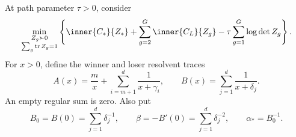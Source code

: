 At path parameter $\tau>0$, consider
\begin{equation}
 \min_{\substack{Z_g\succ0\\ \sum_g\tr Z_g=1}}
 \left\{\inner{C_*}{Z_*}+\sum_{g=2}^G\inner{C_L}{Z_g}
             -\tau\sum_{g=1}^G\log\det Z_g\right\}.
 \label{eq:cond-center-program}
\end{equation}
For $x>0$, define the winner and loser resolvent traces
\begin{equation}
 A(x)=\frac{m}{x}+\sum_{i=m+1}^d\frac1{x+\gamma_i},
 \qquad
 B(x)=\sum_{j=1}^d\frac1{x+\delta_j}.
 \label{eq:cond-resolvents}
\end{equation}
An empty regular sum is zero.  Also put
\begin{equation}
 B_0=B(0)=\sum_{j=1}^d\delta_j^{-1},
 \qquad
 \beta=-B'(0)=\sum_{j=1}^d\delta_j^{-2},
 \qquad
 \alpha_*=B_0^{-1}.
 \label{eq:cond-capacity}
\end{equation}

